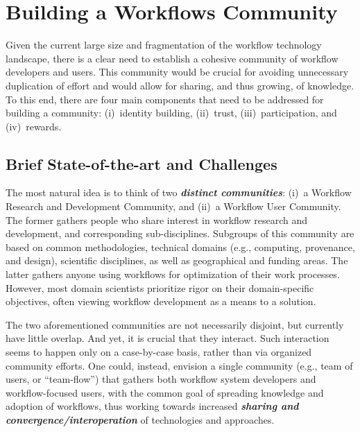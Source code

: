 \section{Building a Workflows Community}
\label{sec:community}

Given the current large size and fragmentation of the workflow technology landscape, there is a clear need to establish a cohesive community of workflow developers and users. This community would be crucial for avoiding unnecessary duplication of effort and would allow for sharing, and thus growing, of knowledge. To this end, there are four main components that need to be addressed for building a community: (i)~identity building, (ii)~trust, (iii)~participation, and (iv)~rewards.


\subsection{Brief State-of-the-art and Challenges}

The most natural idea is to think of two \textbf{\emph{distinct communities}}: (i)~a Workflow Research and Development Community, and (ii)~a Workflow User Community. The former gathers people who share interest in workflow research and development, and corresponding sub-disciplines. Subgroups of this community are based on common methodologies, technical domains (e.g., computing, provenance, and design), scientific disciplines, as well as geographical and funding areas. The latter gathers anyone using workflows for optimization of their work processes. However, most domain scientists prioritize rigor on their domain-specific objectives, often viewing workflow development as a means to a solution.

The two aforementioned communities are not necessarily disjoint, but currently have little overlap. And yet, it is crucial that they interact. Such interaction seems to happen only on a case-by-case basis, rather than via organized community efforts.  One could, instead, envision a single community (e.g., team of users, or ``team-flow'') that gathers both workflow system developers and workflow-focused users, with the common goal of spreading knowledge and adoption of workflows, thus working towards increased \textbf{\emph{sharing and convergence/interoperation}} of technologies and approaches.

